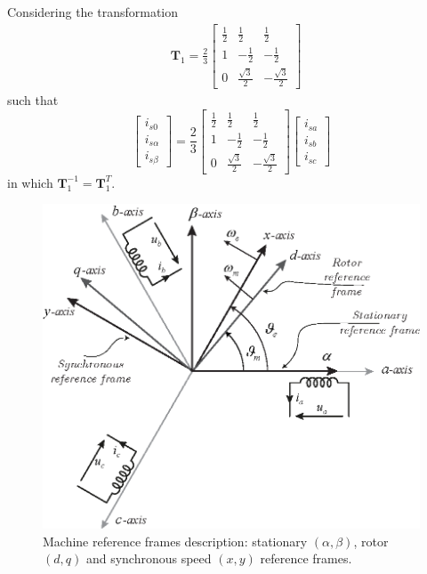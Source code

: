 \documentclass[11pt,a4paper,oneside]{book}
\numberwithin{equation}{section}
\theoremstyle{it}
\theoremstyle{definition}
\begin{document}
Considering the transformation 
\begin{equation}\label{im_eq_9}
	\begin{aligned}
		& \mathbf{T}_1 = 
		\frac{2}{3}\begin{bmatrix}
			\frac{1}{2} & \frac{1}{2} & \frac{1}{2} \\[6pt]
			1 & -\frac{1}{2} & -\frac{1}{2} \\[6pt]
			0 & \frac{\sqrt{3}}{2} & -\frac{\sqrt{3}}{2} 
		\end{bmatrix}
	\end{aligned} 
\end{equation}
such that 
\begin{equation}\label{im_eq_10}
	\left[
	\begin{matrix}
		i_{s0}		\\
		i_{s\alpha} \\
		i_{s\beta}
	\end{matrix} \right] = \frac{2}{3}\begin{bmatrix}
		\frac{1}{2} & \frac{1}{2} & \frac{1}{2} \\[6pt]
		1 & -\frac{1}{2} & -\frac{1}{2} \\[6pt]
		0 & \frac{\sqrt{3}}{2} & -\frac{\sqrt{3}}{2} 
	\end{bmatrix}
	\left[
	\begin{matrix}
		i_{sa} \\
		i_{sb} \\
		i_{sc}
	\end{matrix} \right]
\end{equation}
in which $\mathbf{T}_1^{-1} = \mathbf{T}_1^T$.
\begin{figure}[H]
	\centering
	\includegraphics[width = 330pt, 
	keepaspectratio]{figures/kalman/reference_frames_im.eps}
	\captionsetup{width=.5\textwidth}
	\caption{Machine reference frames description: stationary $(\alpha,\beta)$, 
		rotor $(d,q)$ and synchronous speed $(x,y)$ reference frames.}
	\label{figure_im_ref_frame1} 
\end{figure}
\end{document}
